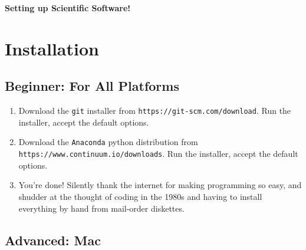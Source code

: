\documentclass{article}
\newcommand{\git}{{\texttt{git}}}
\newcommand{\Anaconda}{{\texttt{Anaconda}}}
\begin{document}
\begin{center}

\vspace*{-2.5cm}
\LARGE
\bf{Setting up Scientific Software!}
\vspace{1cm}
\end{center}

\section{Installation}

\subsection{Beginner: For All Platforms}

\begin{enumerate}

	\item Download the \git{} installer from \texttt{https://git-scm.com/download}.  Run the installer, accept the default options.
	\item Download the \Anaconda{} python distribution from \texttt{https://www.continuum.io/downloads}.  Run the installer, accept the default options.
	\item You're done! Silently thank the internet for making programming so easy, and shudder at the thought of coding in the 1980s and having to install everything by hand from mail-order diskettes.
	
\end{enumerate}
	
\subsection{Advanced: Mac}
\end{document}
